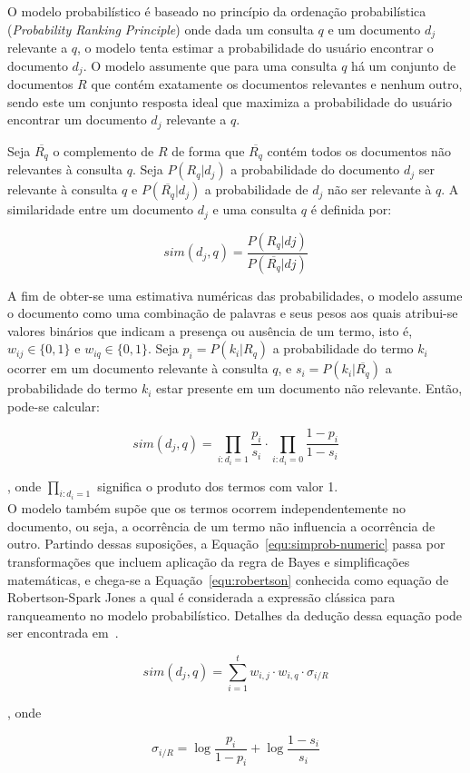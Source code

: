 \documentclass[10pt,a4paper]{article}
\begin{document}
 
 
O modelo probabilístico é baseado no princípio da ordenação probabilística (\textit{Probability Ranking Principle}) onde dada um consulta $q$ e um documento $d_j$ relevante a $q$, o modelo tenta estimar a probabilidade do usuário encontrar o documento $d_j$. O modelo assumente que para uma consulta $q$ há um conjunto de documentos $R$ que contém exatamente os documentos relevantes e nenhum outro, sendo este um conjunto resposta ideal que maximiza a probabilidade do usuário encontrar um documento $d_j$ relevante a $q$. 

Seja $\overline{R_q}$ o complemento de $R$ de forma que $\overline{R_q}$ contém todos os documentos não relevantes à consulta $q$. 
Seja $P(R_q|d_j)$ a probabilidade do documento $d_j$ ser relevante à consulta $q$ e $P(\overline{R_q}|d_j)$ a probabilidade de $d_j$ não ser relevante à $q$. A similaridade entre um documento $d_j$ e uma consulta $q$ é definida por:





\begin{equation}
	sim(d_j, q) = \frac{P(R_q|dj)}{P(\overline{R_q}|dj)} 
	\label{equ:simprob}
\end{equation}


A fim de obter-se uma estimativa numéricas das probabilidades, o modelo assume o documento como uma combinação de palavras e seus pesos aos quais atribui-se valores binários que indicam a presença ou ausência de um termo, isto é, $w_{ij} \in \{0,1\}$ e $w_{iq} \in \{0,1\}$. Seja $p_i = P(k_i|R_q)$ a probabilidade do termo $k_i$ ocorrer em um documento relevante à consulta $q$, e $s_i    = P(k_i|\overline{R_q})$ a probabilidade do termo $k_i$ estar presente em um documento não relevante. Então, pode-se calcular:

\begin{equation}
	sim(d_j, q) = 	
	\prod_{i:d_i=1} \frac{p_i}{s_i} 
	\cdot
	\prod_{i:d_i=0} \frac{1 - p_i}{1 - s_i}
	\label{equ:simprob-numeric}
\end{equation}

, onde $\prod_{i:d_i=1}$ significa o produto dos termos com valor 1.\\


%
%
O modelo também supõe que os termos ocorrem independentemente no documento, ou seja, a ocorrência de um termo não influencia a ocorrência de outro. 
Partindo dessas suposições, a Equação~\ref{equ:simprob-numeric} passa por transformações que incluem aplicação da regra de Bayes e simplificações matemáticas, e chega-se a Equação~\ref{equ:robertson} conhecida como equação de Robertson-Spark Jones a qual é considerada a expressão clássica para ranqueamento no modelo probabilístico. Detalhes da dedução dessa equação pode ser encontrada em~\cite{}.


\begin{equation}
	sim(d_j,q) = \sum_{i=1}^{t} w_{i,j} \cdot w_{i,q}  \cdot \sigma_{i/R}
	\label{equ:robertson}
\end{equation}


, onde

\begin{equation}
	\sigma_{i/R} = \log \frac{p_i}{1-p_i} + \log \frac{1-s_i}{s_i}
\end{equation}
\end{document}
